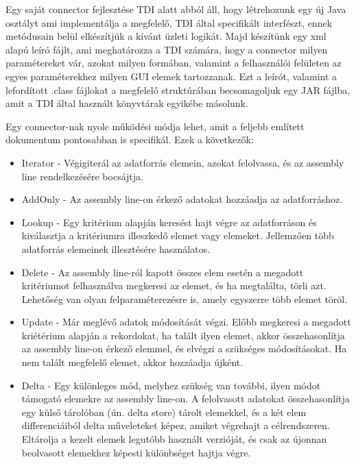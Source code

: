 Egy saját connector fejlesztése TDI alatt abból áll, hogy létrehozunk egy új Java osztályt ami implementálja a megfelelő, TDI által specifikált interfészt, ennek metódusain belül elkészítjük a kívánt üzleti logikát. Majd készítünk egy xml alapú leíró fájlt, ami meghatározza a TDI számára, hogy a connector milyen paramétereket vár, azokat milyen formában, valamint a felhasználói felületen az egyes paraméterekhez milyen GUI elemek tartozzanak. Ezt a leírót, valamint a lefordított .class fájlokat a megfelelő struktúrában becsomagoljuk egy JAR fájlba, amit a TDI által használt könyvtárak egyikébe másolunk. 

Egy connector-nak nyolc működési módja lehet, amit a feljebb említett dokumentum pontosabban is specifikál. Ezek a következők:


\begin{itemize}
	\item Iterator - Végigiterál az adatforrás elemein, azokat felolvassa, és az assembly line rendelkezésére bocsájtja.
	
	\item AddOnly - Az assembly line-on érkező adatokat hozzáadja az adatforráshoz.
	
	\item Lookup - Egy kritérium alapján keresést hajt végre az adatforráson és kiválasztja a kritériumra illeszkedő elemet vagy elemeket. Jellemzően több adatforrás elemeinek illesztésére használatos.
	
	\item Delete - Az assembly line-ról kapott összes elem esetén a megadott kritériumot felhasználva megkeresi az elemet, és ha megtalálta, törli azt. Lehetőség van olyan felparaméterezésre is, amely egyszerre több elemet töröl.
	
	\item Update - Már meglévő adatok módosítását végzi. Előbb  megkeresi a megadott kriétérium alapján a rekordokat, ha talált ilyen elemet, akkor összehasonlítja az assembly line-on érkező elemmel, és elvégzi a szükséges módosításokat. Ha nem talált megfelelő elemet, akkor hozzáadja újként.
	
	\item Delta - Egy különleges mód, melyhez szükség van további, ilyen módot támogató elemekre az assembly line-on. A felolvasott adatokat összehasonlítja egy külső tárolóban (ún. delta store) tárolt elemekkel, és a két elem differenciáiból delta műveleteket képez, amiket végrehajt a célrendszeren. Eltárolja a kezelt elemek legutóbb használt verzióját, és csak az újonnan beolvasott elemekhez képesti különbséget hajtja végre.
	

\end{itemize}
